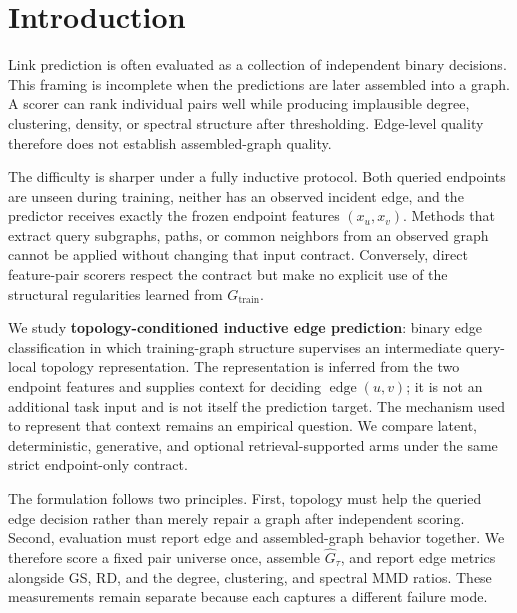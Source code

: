 \section{Introduction}
\label{sec:intro}

Link prediction is often evaluated as a collection of independent binary
decisions. This framing is incomplete when the predictions are later assembled
into a graph. A scorer can rank individual pairs well while producing implausible
degree, clustering, density, or spectral structure after thresholding. Edge-level
quality therefore does not establish assembled-graph quality.

The difficulty is sharper under a fully inductive protocol. Both queried
endpoints are unseen during training, neither has an observed incident edge, and
the predictor receives exactly the frozen endpoint features $(x_u,x_v)$. Methods
that extract query subgraphs, paths, or common neighbors from an observed graph
cannot be applied without changing that input contract. Conversely, direct
feature-pair scorers respect the contract but make no explicit use of the
structural regularities learned from $G_{\mathrm{train}}$.

We study \textbf{topology-conditioned inductive edge prediction}: binary edge
classification in which training-graph structure supervises an intermediate
query-local topology representation. The representation is inferred from the two
endpoint features and supplies context for deciding $\operatorname{edge}(u,v)$;
it is not an additional task input and is not itself the prediction target. The
mechanism used to represent that context remains an empirical question. We
compare latent, deterministic, generative, and optional retrieval-supported arms
under the same strict endpoint-only contract.

The formulation follows two principles. First, topology must help the queried
edge decision rather than merely repair a graph after independent scoring.
Second, evaluation must report edge and assembled-graph behavior together. We
therefore score a fixed pair universe once, assemble $\widehat G_\tau$, and report
edge metrics alongside GS, RD, and the degree, clustering, and spectral MMD
ratios. These measurements remain separate because each captures a different
failure mode.

